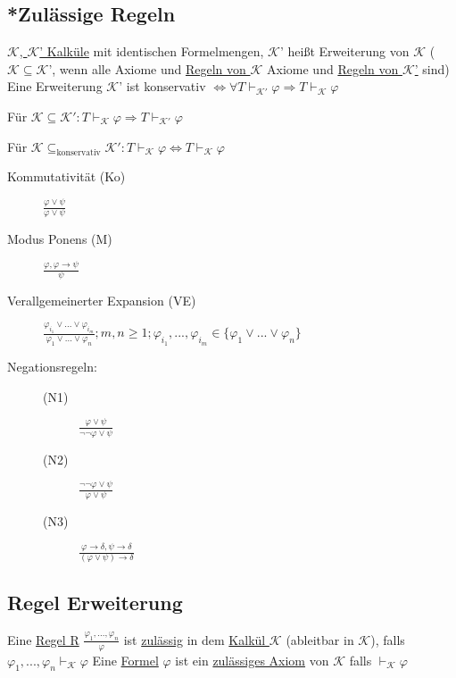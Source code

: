 \documentclass[12pt,a4paper]{article} %
\begin{document}
	\subsection{*Zulässige Regeln}
	\label{Zulassig}
	\hyperref[Kalkul]{$\mathcal{K}$, $\mathcal{K}$' Kalküle} mit identischen Formelmengen, $\mathcal{K}$' heißt Erweiterung von $\mathcal{K}$ ($\mathcal{K} \subseteq \mathcal{K}$', wenn alle Axiome und \hyperref[Kalkul]{Regeln von $\mathcal{K}$} Axiome und \hyperref[Kalkul]{Regeln von $\mathcal{K}$'} sind) \newline
	Eine Erweiterung $\mathcal{K}$' ist konservativ $\Leftrightarrow \forall T \hyperref[Beweisbar]{\vdash_{\mathcal{K}'}} \varphi \Rightarrow T \hyperref[Beweisbar]{\vdash_{\mathcal{K}}} \varphi$
	
	Für $\mathcal{K} \subseteq \mathcal{K}': T \hyperref[Beweisbar]{\vdash_{\mathcal{K}}} \varphi \Rightarrow T \hyperref[Beweisbar]{\vdash_{\mathcal{K}'}} \varphi$
	
	Für $\mathcal{K} \subseteq_{\text{konservativ}} \mathcal{K}': T \hyperref[Beweisbar]{\vdash_{\mathcal{K}}} \varphi \Leftrightarrow T \hyperref[Beweisbar]{\vdash_{\mathcal{K}}} \varphi$

	\begin{description}
		\item[Kommutativität (Ko)] $\frac{\varphi \lor \psi}{\varphi \lor \psi}$
		\item[Modus Ponens (M)] $\frac{\varphi, \varphi \rightarrow \psi}{\psi}$
		\item[Verallgemeinerter Expansion (VE)] $\frac{\varphi_{i_1} \lor ... \lor \varphi_{i_m}}{\varphi_1 \lor ... \lor \varphi_n}; m, n \ge 1; \varphi_{i_1}, ..., \varphi_{i_m} \in \{\varphi_1 \lor ... \lor \varphi_n\}$
		\item[Negationsregeln:] \begin{description}
			\item[(N1)] $\frac{\varphi \lor \psi}{\neg \neg \varphi \lor \psi}$
			\item[(N2)] $\frac{\neg \neg \varphi \lor \psi}{\varphi \lor \psi}$
			\item[(N3)] $\frac{\varphi \rightarrow \delta, \psi \rightarrow \delta}{(\varphi \lor \psi) \rightarrow \delta}$
		\end{description}
	\end{description}
	
	\subsection{Regel Erweiterung}
	Eine \hyperref[Kalkul]{Regel R} $\frac{\varphi_1, ..., \varphi_n}{\varphi}$ ist \hyperref[Zulassig]{zulässig} in dem \hyperref[Kalkul]{Kalkül $\mathcal{K}$} (ableitbar in $\mathcal{K}$), falls $\varphi_1, ..., \varphi_n \hyperref[Beweisbar]{\vdash_{\mathcal{K}}} \varphi$ \newline
	Eine \hyperref[Formel]{Formel} $\varphi$ ist ein \hyperref[Zulassig]{zulässiges Axiom} von $\mathcal{K}$ falls $\hyperref[Beweisbar]{\vdash_{\mathcal{K}}} \varphi$
	
\end{document}
